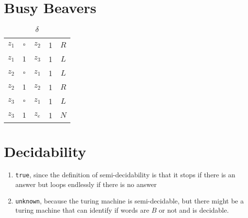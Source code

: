 \documentclass[sectionformat=exercise]{gadsescript}
\begin{document}
\section{Busy Beavers}
\begin{table}[H]
	\centering
	\begin{tabular}{cc|cc||c}
		$ z_1 $ & $ \square $ & $ z_2 $ & 1 & $ R $ \\
		$ z_1 $ & $ 1 $ & $ z_3 $ & 1 & $ L $ \\
		$ z_2 $ & $ \square $ & $ z_1 $ & 1 & $ L $ \\
		$ z_2 $ & $ 1 $ & $ z_2 $ & 1 & $ R $ \\
		$ z_3 $ & $ \square $ & $ z_1 $ & 1 & $ L $ \\
		$ z_3 $ & $ 1 $ & $ z_e $ & 1 & $ N $ \\
	\end{tabular}
	\caption{$ \delta $ }
	\label{tab:delta}
\end{table}

\section{Decidability}
\begin{enumerate}[label=\alph*)]
	\item \texttt{true}, since the definition of semi-decidability is that it stops if there is an answer but loops endlessly if there is no answer
	\item \texttt{unknown}, because the turing machine is semi-decidable, but there might be a turing machine that can identify if words are $ B $ or not and is decidable.
\end{enumerate}
\end{document}
